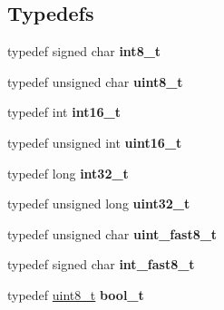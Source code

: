 \subsection*{Typedefs}
\begin{DoxyCompactItemize}
\item 
\mbox{\label{group__hal__hcs08_gaef44329758059c91c76d334e8fc09700}} 
typedef signed char {\bfseries int8\+\_\+t}
\item 
\mbox{\label{group__hal__hcs08_gaba7bc1797add20fe3efdf37ced1182c5}} 
typedef unsigned char {\bfseries uint8\+\_\+t}
\item 
\mbox{\label{group__hal__hcs08_gab5525e8f9f02c79fbadd0f03ff724e23}} 
typedef int {\bfseries int16\+\_\+t}
\item 
\mbox{\label{group__hal__hcs08_ga1f1825b69244eb3ad2c7165ddc99c956}} 
typedef unsigned int {\bfseries uint16\+\_\+t}
\item 
\mbox{\label{group__hal__hcs08_ga0d2e949ab6a1bb62f1b295cc79bc1f60}} 
typedef long {\bfseries int32\+\_\+t}
\item 
\mbox{\label{group__hal__hcs08_ga06896e8c53f721507066c079052171f8}} 
typedef unsigned long {\bfseries uint32\+\_\+t}
\item 
\mbox{\label{group__hal__hcs08_ga2d31063fef649c85396fb28130ef9795}} 
typedef unsigned char {\bfseries uint\+\_\+fast8\+\_\+t}
\item 
\mbox{\label{group__hal__hcs08_gafa981e0352f65c207364c9cb82246b53}} 
typedef signed char {\bfseries int\+\_\+fast8\+\_\+t}
\item 
\mbox{\label{group__hal__hcs08_ga57c3b7201116536b822f0f8520aa99c7}} 
typedef \hyperlink{group__hal__dos_gae1affc9ca37cfb624959c866a73f83c2}{uint8\+\_\+t} {\bfseries bool\+\_\+t}
\end{DoxyCompactItemize}
